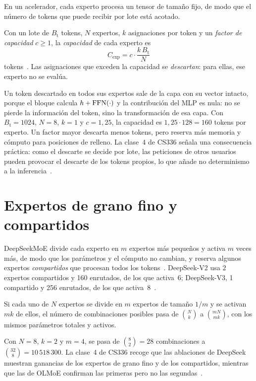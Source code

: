 En un acelerador, cada experto procesa un tensor de tamaño fijo, de modo que el número de tokens que puede recibir por lote está acotado.

\begin{definicion}\label{def:capacidad}
Con un lote de $B_{\mathrm{t}}$ tokens, $N$ expertos, $k$ asignaciones por token y un \emph{factor de capacidad} $c\ge 1$, la \emph{capacidad} de cada experto es
\[
C_{\mathrm{exp}}=c\cdot\frac{k\,B_{\mathrm{t}}}{N}
\]
tokens~\cite[§2.2, ec.~3]{switch}. Las asignaciones que exceden la capacidad se \emph{descartan}: para ellas, ese experto no se evalúa.
\end{definicion}

Un token descartado en todos sus expertos sale de la capa con su vector intacto, porque el bloque calcula $h+\operatorname{FFN}(\cdot)$ y la contribución del MLP es nula: no se pierde la información del token, sino la transformación de esa capa. Con $B_{\mathrm{t}}=1024$, $N=8$, $k=1$ y $c=1{,}25$, la capacidad es $1{,}25\cdot 128=160$ tokens por experto. Un factor mayor descarta menos tokens, pero reserva más memoria y cómputo para posiciones de relleno. La clase~4 de CS336 señala una consecuencia práctica: como el descarte se decide por lote, las peticiones de otros usuarios pueden provocar el descarte de los tokens propios, lo que añade no determinismo a la inferencia~\cite{cs336}.

\section{Expertos de grano fino y compartidos}

DeepSeekMoE divide cada experto en $m$ expertos más pequeños y activa $m$ veces más, de modo que los parámetros y el cómputo no cambian, y reserva algunos expertos \emph{compartidos} que procesan todos los tokens~\cite[§2.2.1]{deepseekv2}. DeepSeek-V2 usa 2 expertos compartidos y 160 enrutados, de los que activa~6; DeepSeek-V3, 1 compartido y 256 enrutados, de los que activa~8~\cite{deepseekv2,deepseekv3}.

\begin{proposicion}\label{prop:combinaciones}
Si cada uno de $N$ expertos se divide en $m$ expertos de tamaño $1/m$ y se activan $mk$ de ellos, el número de combinaciones posibles pasa de $\binom{N}{k}$ a $\binom{mN}{mk}$, con los mismos parámetros totales y activos.
\end{proposicion}

Con $N=8$, $k=2$ y $m=4$, se pasa de $\binom82=28$ combinaciones a $\binom{32}{8}=10\,518\,300$. La clase~4 de CS336 recoge que las ablaciones de DeepSeek muestran ganancias de los expertos de grano fino y de los compartidos, mientras que las de OLMoE confirman las primeras pero no las segundas~\cite{cs336}.

